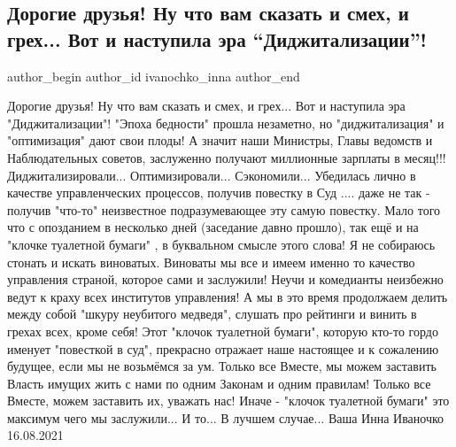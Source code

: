  
 
 
 
 
 
\subsection{Дорогие друзья! Ну что вам сказать и смех, и грех... Вот и наступила эра \enquote{Диджитализации}!}
\label{sec:16_08_2021.fb.ivanochko_inna.1.era_digilitalizacia}
 
\ifcmt
 author_begin
   author_id ivanochko_inna
 author_end
\fi


\obeycr
Дорогие друзья! 
Ну что вам сказать и смех, и грех... 
Вот и наступила эра "Диджитализации"! 
"Эпоха бедности"  прошла незаметно, но "диджитализация" и "оптимизация" дают свои плоды! 
А значит наши Министры, Главы ведомств и Наблюдательных советов, заслуженно получают миллионные зарплаты в месяц!!! 
Диджитализировали... 
Оптимизировали...
Сэкономили... 
Убедилась лично в качестве управленческих процессов, получив повестку в Суд .... даже не так  - получив "что-то" неизвестное подразумевающее эту самую повестку.
Мало того что с опозданием в несколько дней (заседание давно прошло), так ещё и на "клочке туалетной бумаги" , в буквальном смысле этого слова! 
Я не собираюсь стонать и искать виноватых. 
Виноваты мы все и имеем именно то качество управления страной, которое сами и заслужили! 
Неучи и комедианты неизбежно ведут к краху всех институтов управления! 
А мы в это время продолжаем делить между собой "шкуру неубитого медведя", слушать про рейтинги и винить в  грехах всех, кроме себя! 
Этот "клочок туалетной бумаги", которую кто-то гордо именует "повесткой в суд", прекрасно отражает наше настоящее и к сожалению будущее, если мы не возьмёмся за ум. 
Только все Вместе, мы можем заставить Власть имущих жить с нами по одним Законам и одним правилам! 
Только все Вместе, можем заставить их, уважать нас! 
Иначе - "клочок туалетной бумаги" это максимум чего мы заслужили... 
И то... 
В лучшем случае... 
Ваша Инна Иваночко
16.08.2021
\restorecr

